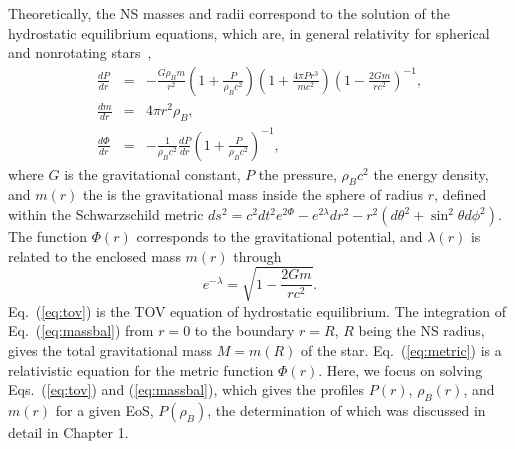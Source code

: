 Theoretically, the NS masses and radii correspond to the 
solution of the hydrostatic equilibrium equations, which are, in general 
relativity for spherical and nonrotating 
stars~\cite{Tolman1939,Oppenheimer1939},
%
\begin{eqnarray}
  \frac{dP}{dr} &=& -\frac{G\rho_B m}{r^2}\left(1 + \frac{P}{\rho_B
  c^2}\right)\left(1+\frac{4\pi
  Pr^3}{mc^2}\right)\left(1-\frac{2Gm}{rc^2}\right)^{-1},\label{eq:tov}\\
      \frac{dm}{dr} &=& 4\pi r^2\rho_B,\label{eq:massbal}\\
  \frac{d\Phi}{dr} &=& -\frac{1}{\rho_B
    c^2}\frac{dP}{dr}\left(1+\frac{P}{\rho_B
  c^2}\right)^{-1}\label{eq:metric},
\end{eqnarray}
%
where $G$ is the gravitational constant, $P$ the pressure, $\rho_B c^2$ the
energy density, and $m(r)$ the is the gravitational mass inside the sphere of
radius $r$, defined within the Schwarzschild metric $ds^2 = c^2dt^2e^{2\Phi} 
- e^{2\lambda}dr^2 - r^2(d\theta^2 + \sin^2\theta d\phi^2)$. The function 
$\Phi(r)$ corresponds to the gravitational potential, and $\lambda(r)$ is 
related to the enclosed mass $m(r)$ through
%
\begin{equation}
  e^{-\lambda} = \sqrt{1-\frac{2Gm}{rc^2}}.
\end{equation}
%
Eq.~(\ref{eq:tov}) is the TOV equation 
of hydrostatic equilibrium. The integration of Eq.~(\ref{eq:massbal}) from
$r=0$ to the boundary $r=R$, $R$ being the NS radius, gives the total
gravitational mass $M=m(R)$ of the star. Eq.~(\ref{eq:metric}) is a 
relativistic equation for the metric function $\Phi(r)$. Here, we focus on 
solving Eqs.~(\ref{eq:tov}) and 
(\ref{eq:massbal}), which gives the profiles $P(r)$, $\rho_B(r)$, and $m(r)$ 
for a given EoS, $P(\rho_B)$, the determination of which was discussed in 
detail in Chapter 1.

